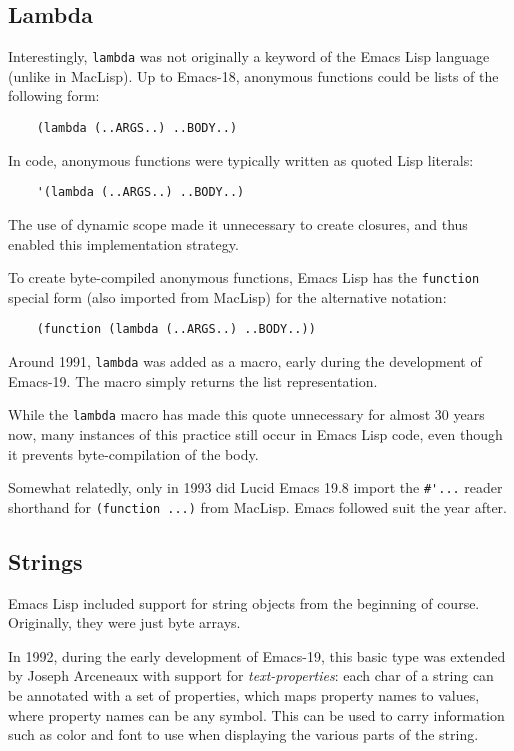 \documentclass[format=acmsmall, review]{acmart}
\newcommand \Elisp {Emacs Lisp}
\begin{document}
\subsection{Lambda}
\label{sec:lambda}

Interestingly, \texttt{lambda} was not originally a keyword of the
\Elisp{} language (unlike in MacLisp).  Up to Emacs-18, anonymous
functions could be lists of the following form:
%
\begin{verbatim}
    (lambda (..ARGS..) ..BODY..)
\end{verbatim}
%
In code, anonymous functions were typically written as quoted Lisp
literals:
%
\begin{verbatim}
    '(lambda (..ARGS..) ..BODY..)
\end{verbatim}
%
The use of dynamic scope made it unnecessary to create closures, and
thus enabled this implementation strategy.


To create byte-compiled anonymous functions, \Elisp{} has the
\texttt{function} special form (also imported from MacLisp) for the
alternative notation:
%
\begin{verbatim}
    (function (lambda (..ARGS..) ..BODY..))
\end{verbatim}
%
Around 1991, \texttt{lambda} was added as a macro, early during the
development of Emacs-19.  The macro simply returns the list
representation.

While the \texttt{lambda} macro has made this quote unnecessary for almost
30 years now, many instances of this practice still occur in \Elisp{} code,
even though it prevents byte-compilation of the body.

Somewhat relatedly, only in 1993 did Lucid Emacs 19.8 import the
\verb|#'...| reader shorthand for \texttt{(function ...)} from MacLisp.  Emacs
followed suit the year after.

\subsection{Strings}
\label{sec:strings}

\Elisp{} included support for string objects from the beginning of course.
Originally, they were just byte arrays.

In 1992, during the early development of Emacs-19, this basic type was
extended by Joseph Arceneaux with support for \emph{text-properties}: each
char of a string can be annotated with a set of properties, which maps
property names to values, where property names can be any symbol.  This can
be used to carry information such as color and font to use when displaying
the various parts of the string.
\end{document}
